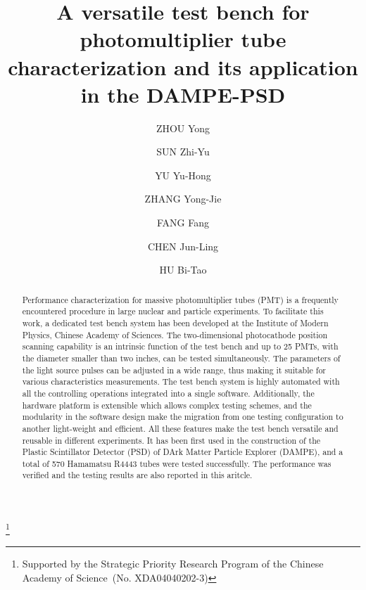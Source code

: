 \documentclass{nst}
\begin{document}
\title{A versatile test bench for photomultiplier tube characterization and its application in the DAMPE-PSD}\thanks{Supported by the Strategic Priority Research Program of the Chinese Academy of Science~(No. XDA04040202-3)}

\author[周勇]{ZHOU Yong}
\author[孙志宇]{SUN Zhi-Yu}
\author[余玉洪]{YU Yu-Hong}
\author[张永杰]{ZHANG Yong-Jie}
\author[方芳]{FANG Fang}
\author[陈俊岭]{CHEN Jun-Ling}
\author[胡碧涛]{HU Bi-Tao}


\begin{abstract}
 Performance characterization for massive photomultiplier tubes (PMT) is a frequently encountered procedure in large nuclear and particle experiments. To facilitate this work, a dedicated test bench system has been developed at the Institute of Modern Physics, Chinese Academy of Sciences.
 The two-dimensional photocathode position scanning capability is an intrinsic function of the test bench and up to 25 PMTs, with the diameter smaller than two inches, can be tested simultaneously.
 The parameters of the light source pulses can be adjusted in a wide range, thus making it suitable for various characteristics measurements.
 The test bench system is highly automated with all the controlling operations integrated into a single software. 
 Additionally, the hardware platform is extensible which allows complex testing schemes, and the modularity in the software design make the migration from one testing configuration to another light-weight and efficient.
 All these features make the test bench versatile and reusable in different experiments.
 It has been first used in the construction of the Plastic Scintillator Detector (PSD) of DArk Matter Particle Explorer (DAMPE), and a total of 570 Hamamatsu R4443 tubes were tested successfully. The performance was verified and the testing results are also reported in this aritcle.
\end{abstract}
\end{document}
